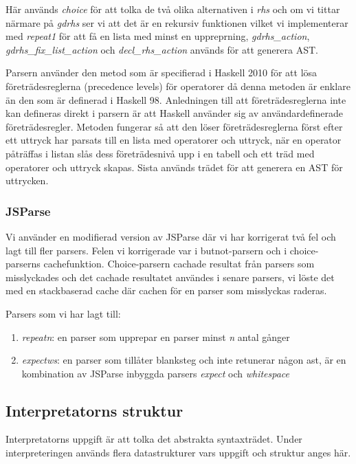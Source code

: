 Här används \emph{choice} för att tolka de två olika alternativen i \emph{rhs} och om vi tittar närmare på \emph{gdrhs} 
ser vi att det är en rekursiv funktionen vilket vi implementerar med \emph{repeat1} för att få en lista med minst en uppreprning, 
\emph{gdrhs\_action}, \emph{gdrhs\_fix\_list\_action} och \emph{decl\_rhs\_action} används för att generera AST.

Parsern använder den metod som är specifierad i Haskell 2010 \citep{haskell2010} för att lösa företrädesreglerna (precedence levels) för operatorer då denna metoden är enklare än den som är definerad i Haskell 98. 
Anledningen till att företrädesreglerna inte kan defineras direkt i parsern är att Haskell använder sig av användardefinerade företrädesregler.
Metoden fungerar så att den löser företrädesreglerna först efter ett uttryck har parsats till en lista med operatorer 
och uttryck, när en operator påträffas i listan slås dess företrädesnivå upp i en tabell och ett träd med 
operatorer och uttryck skapas. Sista används trädet för att generera en AST för uttrycken.

\subsubsection{JSParse}
Vi använder en modifierad version av JSParse där vi har korrigerat två fel och lagt till fler parsers. Felen vi korrigerade var i butnot-parsern och i choice-parserns cachefunktion. 
Choice-parsern cachade resultat från parsers som misslyckades och det cachade resultatet användes i senare parsers, 
vi löste det med en stackbaserad cache där cachen för en parser som misslyckas raderas.

Parsers som vi har lagt till:
\begin{enumerate}
    \item{\emph{repeatn}: en parser som upprepar en parser minst \emph{n} antal gånger}
    \item{\emph{expectws}: en parser som tillåter blanksteg och inte retunerar någon ast, är en kombination av JSParse inbyggda parsers \emph{expect} och \emph{whitespace}}
\end{enumerate}



\subsection{Interpretatorns struktur}
Interpretatorns uppgift är att tolka det abstrakta syntaxträdet. Under interpreteringen används flera datastrukturer vars uppgift och struktur anges här.


